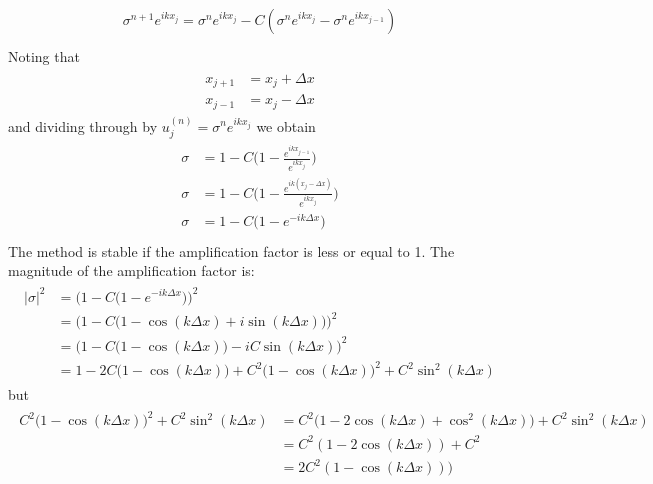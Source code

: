 	\begin{align}
		\begin{split}
			\sigma ^{n+1}e^{ikx_j} = \sigma^{n}{e^{ikx_j}} - C(\sigma ^{n}e^{ikx_j} - \sigma ^{n}e^{ikx_{j-1}}) \\
		\end{split}
	\end{align}
	Noting that	
	\begin{align}
		\begin{split}
			x_{j+1} &= x_j + \Delta x \\
			x_{j-1} &= x_j - \Delta x
		\end{split}
	\end{align}	
	and dividing through by $u_j^{(n)} = \sigma^ne^{ikx_j}$ we obtain
	\begin{align}
		\begin{split}
			\sigma &= 1 - C\Big(1 - \frac{e^{ikx_{j-1}}}{e^{ikx_j}}\Big) \\
			\sigma &= 1 - C\Big(1 - \frac{e^{ik (x_j - \Delta x)}}{e^{ikx_j}}\Big) \\
			\sigma &= 1 - C\Big(1 - e^{-ik\Delta x}\Big) \\
		\end{split}
	\end{align}
	The method is stable if the amplification factor is less or equal to 1. The magnitude of the amplification factor is:
	\begin{align}
		\begin{split}
			\label{app:for:sigmaExplicit}
			|\sigma|^2 &= \Bigg( 1 - C\Big(1 - e^{-ik\Delta x}\Big)\Bigg)^2 \\
			&= \Bigg( 1 - C\Big(1 -\cos(k\Delta x) + i\sin(k\Delta x)\Big)\Bigg)^2 \\
			&= \Bigg(1 - C\Big(1 -\cos(k\Delta x)\Big) - iC\sin(k\Delta x)\Bigg)^2 \\	
			&= 1 - 2C\Big(1 - \cos(k\Delta x)\Big) + C^2\Big(1 -\cos(k\Delta x)\Big)^2 + C^2\sin^2(k\Delta x)
		\end{split}
	\end{align} 	
	but	
	\begin{align}
		\begin{split}
			\label{app:for:dependencyExplicit}
			C^2\Big(1 -\cos(k\Delta x)\Big)^2 + C^2\sin^2(k\Delta x) &=C^2\Bigg(1 - 2\cos(k\Delta x) + \cos^2(k\Delta x)\Bigg) + C^2\sin^2(k\Delta x) \\
			&= C^2(1-2\cos(k\Delta x)) + C^2 \\
			&= 2C^2(1-\cos(k\Delta x)))
		\end{split}
	\end{align} 	
